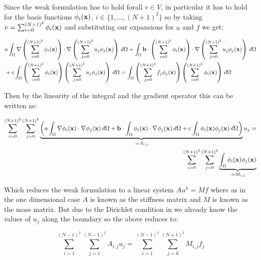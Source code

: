 Since the weak formulation  has to hold
forall $v \in V$, in particular it has to hold for the basis functions
$\phi_i(\mathbf{x})$, $i \in \{1,\ldots,(N + 1)^2\}$ so by taking
$v = \sum_{i = 0}^{(N+1)^2}\phi_i(\mathbf{x})$ and substituting our expansions
for $u$ and $f$ we get:

\begin{align}
\begin{split}
	&a\int_{\Omega}\nabla\left(\sum_{i = 0}^{(N+1)^2}\phi_i(\mathbf{x})\right) \cdot
                  \nabla\left(\sum_{j = 0}^{(N+1)^2}u_j\phi_j(\mathbf{x})\right)\, d\Omega
    +\int_{\Omega}\mathbf{b}\cdot\left(\sum_{i = 0}^{(N+1)^2}\phi_i(\mathbf{x})\right) \cdot
                  \nabla\left(\sum_{j = 0}^{(N+1)^2}u_j\phi_j(\mathbf{x})\right)\, d\Omega \\
    &+c\int_{\Omega}\left(\sum_{i = 0}^{(N + 1)^2}\phi_i(\mathbf{x})\right)
                    \left(\sum_{j = 0}^{(N + 1)^2}u_j\phi_j(\mathbf{x})\right)\, d\Omega =
    \int_{\Omega}\left(\sum_{j = 0}^{(N + 1)^2}f_j\phi_j(\mathbf{x})\right)
                 \left(\sum_{i = 0}^{(N + 1)^2}\phi_i(\mathbf{x})\right)\, d\Omega
\end{split}
\end{align}

Then by the linearity of the integral and the gradient operator this can be
written as:

\begin{align}\label{eq:twod-deterministic-discrete}
  \begin{split}
	\sum_{i=0}^{(N+1)^2}\sum_{j=0}^{(N+1)^2}
      \underbrace{\left(
         a\int_{\Omega}\nabla\phi_i(\mathbf{x})\cdot\nabla\phi_j(\mathbf{x})\, d\Omega
         + \mathbf{b}\cdot\int_{\Omega}\phi_i(\mathbf{x})\cdot\nabla\phi_j(\mathbf{x})\, d\Omega
         +c\int_{\Omega}\phi_i(\mathbf{x})\phi_j(\mathbf{x})\, d\Omega
      \right)}_{:= A_{i,j}}u_j = \\
    \sum_{i=0}^{(N + 1)^2}\sum_{j=0}^{(N + 1)^2}
      \underbrace{\int_{\Omega}\phi_i(\mathbf{x})\phi_j(\mathbf{x})}_{:= M_{i,j}}
  \end{split}
\end{align}

Which reduces the weak formulation  to a linear
system $Au^h = Mf$ where as in the one dimensional case $A$ is known as
the stiffness matrix and $M$ is known as the mass matrix. But due to the Dirichlet
condition in  we already know the values of $u_j$
along the boundary so the above reduces to:

\begin{equation}
	\sum_{i = 1}^{(N-1)^2}\sum_{j=1}^{(N-1)^2}A_{i,j}u_j =
    \sum_{i=1}^{(N-1)^2}\sum_{j=0}^{(N+1)^2}M_{i,j}f_j
\end{equation}

